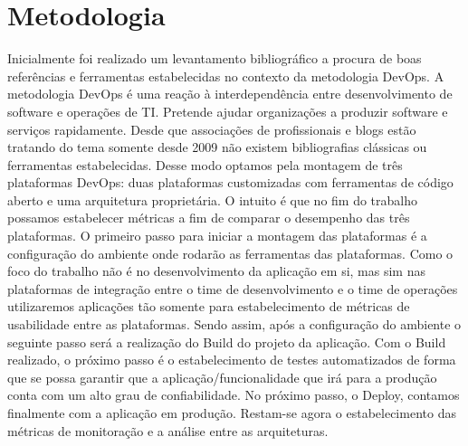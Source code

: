\section{Metodologia}

Inicialmente foi realizado um levantamento bibliográfico a procura de boas referências e ferramentas estabelecidas no contexto da metodologia DevOps. A metodologia DevOps é uma reação à interdependência entre desenvolvimento de software e operações de TI. Pretende ajudar organizações a produzir software e serviços rapidamente. Desde que associações de profissionais e blogs estão tratando do tema somente desde 2009 não existem bibliografias clássicas ou ferramentas estabelecidas. Desse modo optamos pela montagem de três plataformas DevOps: duas plataformas customizadas com ferramentas de código aberto e uma arquitetura proprietária. O intuito é que no fim do trabalho possamos estabelecer métricas a fim de comparar o desempenho das três plataformas.
O primeiro passo para iniciar a montagem das plataformas é a configuração do ambiente onde rodarão as ferramentas das plataformas.
Como o foco do trabalho não é no desenvolvimento da aplicação em si, mas sim nas plataformas de integração entre o time de desenvolvimento e o time de operações utilizaremos aplicações tão somente para estabelecimento de métricas de usabilidade entre as plataformas. Sendo assim, após a configuração do ambiente o seguinte passo será a realização do Build do projeto da aplicação.
Com o Build realizado, o próximo passo é o estabelecimento de testes automatizados de forma que se possa garantir que a aplicação/funcionalidade que irá para a produção conta com um alto grau de confiabilidade.
No próximo passo, o Deploy, contamos finalmente com a aplicação em produção. Restam-se agora o estabelecimento das métricas de monitoração e a análise entre as arquiteturas.
